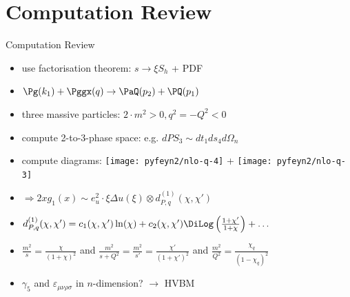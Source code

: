 \section{Computation Review}
\begin{frame}{Computation Review}
\begin{itemize}
\item use factorisation theorem: $s\to \xi S_h$ + PDF
\item $\Pg(k_1) + \Pggx(q) \to \PaQ(p_2) + \PQ(p_1)$
\item three massive particles: $2\cdot m^2>0,q^2=-Q^2<0$
\item compute 2-to-3-phase space: e.g. $dPS_3 \sim dt_1ds_4d\Omega_n$
\item compute diagrams: \texttt{[image: pyfeyn2/nlo-q-4]} + \texttt{[image: pyfeyn2/nlo-q-3]}
\item $\Rightarrow 2xg_1(x) \sim e_u^2\cdot \xi\Delta u(\xi) \otimes d_{P,q}^{(1)}(\chi,\chi')$
\item $d_{P,q}^{(1)}(\chi,\chi') = c_1(\chi,\chi')\ln(\chi) + c_2(\chi,\chi')\DiLog\left(\frac{1+\chi'}{1+\chi}\right)+\ldots$ \checkmark
\item $\frac{m^2}{s} = \frac{\chi}{(1+\chi)^2}$ and $\frac{m^2}{s+Q^2} = \frac{m^2}{s'} = \frac{\chi'}{(1+\chi')^2}$ and $\frac{m^2}{Q^2} = \frac{\chi_q}{(1-\chi_q)^2}$
\item $\gamma_5$ and $\varepsilon_{\mu\nu\rho\sigma}$ in $n$-dimension? $\to$ HVBM
\end{itemize}
\end{frame}


